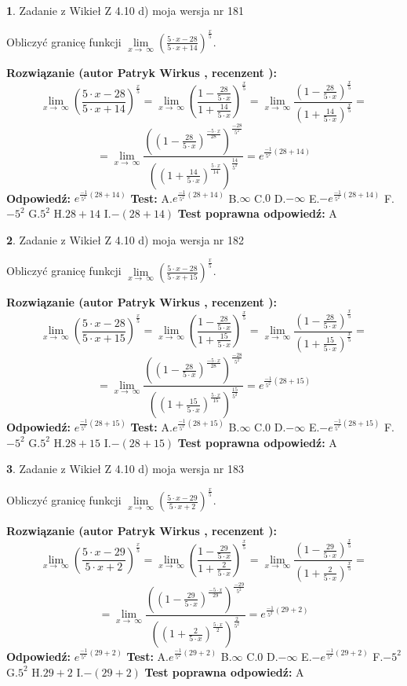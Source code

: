 \documentclass[12pt, a4paper]{article}
\theoremstyle{definition} %
\newtheorem{zad}{}
\newcommand{\zadStart}[1]{\begin{zad}#1\newline}
\newcommand{\zadStop}{\end{zad}}
\newcommand{\rozwStart}[2]{\noindent \textbf{Rozwiązanie (autor #1 , recenzent #2): }\newline}
\newcommand{\rozwStop}{\newline}
\newcommand{\odpStart}{\noindent \textbf{Odpowiedź:}\newline}
\newcommand{\odpStop}{\newline}
\newcommand{\testStart}{\noindent \textbf{Test:}\newline}
\newcommand{\testStop}{\newline}
\newcommand{\kluczStart}{\noindent \textbf{Test poprawna odpowiedź:}\newline}
\newcommand{\kluczStop}{\newline}
\begin{document}
\zadStart{Zadanie z Wikieł Z 4.10 d) moja wersja nr 181}


Obliczyć granicę funkcji  $\lim\limits_{x\to\ \infty}(\frac{5\cdot x-28}{5\cdot x+14})^{\frac{x}{5}}$.
\zadStop
\rozwStart{Patryk Wirkus}{}
$$\lim\limits_{x\to\ \infty}(\frac{5\cdot x-28}{5\cdot x+14})^{\frac{x}{5}} = \lim\limits_{x\to\ \infty}(\frac{1-\frac{28}{5\cdot x}}{1+\frac{14}{5\cdot x}})^{\frac{x}{5}}=\lim\limits_{x\to\ \infty}\frac{(1-\frac{28}{5\cdot x})^{\frac{x}{5}}}{(1+\frac{14}{5\cdot x})^{\frac{x}{5}}}=$$
$$=\lim\limits_{x\to\ \infty}\frac{((1-\frac{28}{5\cdot x})^{\frac{-5\cdot x}{28}})^{\frac{-28}{5^{2}}}}{((1+\frac{14}{5\cdot x})^{\frac{5\cdot x}{14}})^{\frac{14}{5^{2}}}}=e^{\frac{-1}{5^{2}}(28+14)}$$
\rozwStop
\odpStart
$e^{\frac{-1}{5^{2}}(28+14)}$
\odpStop
\testStart
A.$e^{\frac{-1}{5^{2}}(28+14)}$ B.$\infty$ C.$0$ D.$-\infty$ E.$-e^{\frac{-1}{5^{2}}(28+14)}$
F.$-5^{2}$ G.$5^{2}$
H.$28+14$
I.$-(28+14)$
\testStop
\kluczStart
A
\kluczStop



\zadStart{Zadanie z Wikieł Z 4.10 d) moja wersja nr 182}


Obliczyć granicę funkcji  $\lim\limits_{x\to\ \infty}(\frac{5\cdot x-28}{5\cdot x+15})^{\frac{x}{5}}$.
\zadStop
\rozwStart{Patryk Wirkus}{}
$$\lim\limits_{x\to\ \infty}(\frac{5\cdot x-28}{5\cdot x+15})^{\frac{x}{5}} = \lim\limits_{x\to\ \infty}(\frac{1-\frac{28}{5\cdot x}}{1+\frac{15}{5\cdot x}})^{\frac{x}{5}}=\lim\limits_{x\to\ \infty}\frac{(1-\frac{28}{5\cdot x})^{\frac{x}{5}}}{(1+\frac{15}{5\cdot x})^{\frac{x}{5}}}=$$
$$=\lim\limits_{x\to\ \infty}\frac{((1-\frac{28}{5\cdot x})^{\frac{-5\cdot x}{28}})^{\frac{-28}{5^{2}}}}{((1+\frac{15}{5\cdot x})^{\frac{5\cdot x}{15}})^{\frac{15}{5^{2}}}}=e^{\frac{-1}{5^{2}}(28+15)}$$
\rozwStop
\odpStart
$e^{\frac{-1}{5^{2}}(28+15)}$
\odpStop
\testStart
A.$e^{\frac{-1}{5^{2}}(28+15)}$ B.$\infty$ C.$0$ D.$-\infty$ E.$-e^{\frac{-1}{5^{2}}(28+15)}$
F.$-5^{2}$ G.$5^{2}$
H.$28+15$
I.$-(28+15)$
\testStop
\kluczStart
A
\kluczStop



\zadStart{Zadanie z Wikieł Z 4.10 d) moja wersja nr 183}


Obliczyć granicę funkcji  $\lim\limits_{x\to\ \infty}(\frac{5\cdot x-29}{5\cdot x+2})^{\frac{x}{5}}$.
\zadStop
\rozwStart{Patryk Wirkus}{}
$$\lim\limits_{x\to\ \infty}(\frac{5\cdot x-29}{5\cdot x+2})^{\frac{x}{5}} = \lim\limits_{x\to\ \infty}(\frac{1-\frac{29}{5\cdot x}}{1+\frac{2}{5\cdot x}})^{\frac{x}{5}}=\lim\limits_{x\to\ \infty}\frac{(1-\frac{29}{5\cdot x})^{\frac{x}{5}}}{(1+\frac{2}{5\cdot x})^{\frac{x}{5}}}=$$
$$=\lim\limits_{x\to\ \infty}\frac{((1-\frac{29}{5\cdot x})^{\frac{-5\cdot x}{29}})^{\frac{-29}{5^{2}}}}{((1+\frac{2}{5\cdot x})^{\frac{5\cdot x}{2}})^{\frac{2}{5^{2}}}}=e^{\frac{-1}{5^{2}}(29+2)}$$
\rozwStop
\odpStart
$e^{\frac{-1}{5^{2}}(29+2)}$
\odpStop
\testStart
A.$e^{\frac{-1}{5^{2}}(29+2)}$ B.$\infty$ C.$0$ D.$-\infty$ E.$-e^{\frac{-1}{5^{2}}(29+2)}$
F.$-5^{2}$ G.$5^{2}$
H.$29+2$
I.$-(29+2)$
\testStop
\kluczStart
A
\kluczStop
\end{document}
